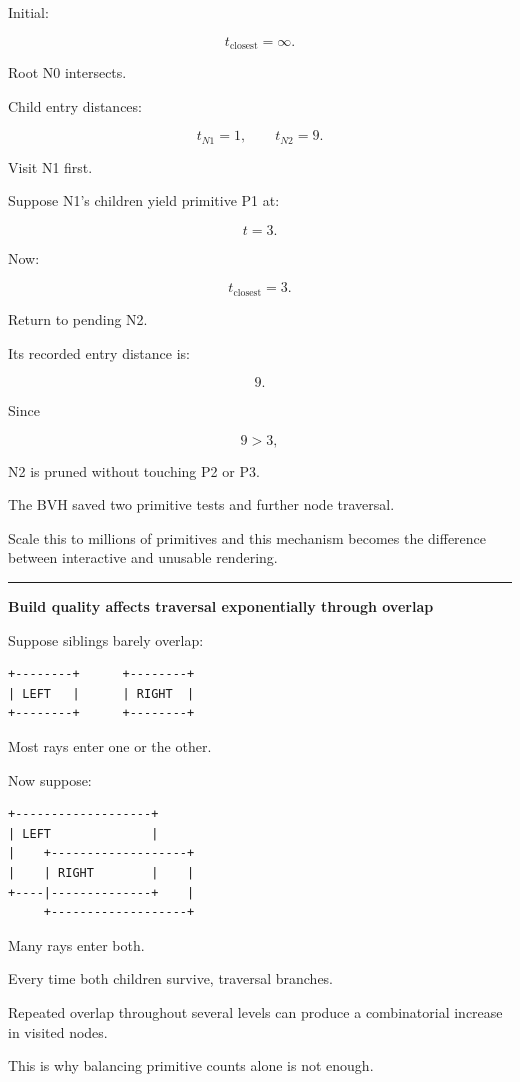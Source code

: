 Initial:

\[
t_{\text{closest}}=\infty.
\]

Root N0 intersects.

Child entry distances:

\[
t_{N1}=1,
\qquad
t_{N2}=9.
\]

Visit N1 first.

Suppose N1's children yield primitive P1 at:

\[
t=3.
\]

Now:

\[
t_{\text{closest}}=3.
\]

Return to pending N2.

Its recorded entry distance is:

\[
9.
\]

Since

\[
9>3,
\]

N2 is pruned without touching P2 or P3.

The BVH saved two primitive tests and further node traversal.

Scale this to millions of primitives and this mechanism becomes the difference between interactive and unusable rendering.

\begin{center}\rule{0.5\linewidth}{0.5pt}\end{center}

\textbf{Build quality affects traversal exponentially through overlap}

Suppose siblings barely overlap:

\begin{verbatim}
+--------+      +--------+
| LEFT   |      | RIGHT  |
+--------+      +--------+
\end{verbatim}

Most rays enter one or the other.

Now suppose:

\begin{verbatim}
+-------------------+
| LEFT              |
|    +-------------------+
|    | RIGHT        |    |
+----|--------------+    |
     +-------------------+
\end{verbatim}

Many rays enter both.

Every time both children survive, traversal branches.

Repeated overlap throughout several levels can produce a combinatorial increase in visited nodes.

This is why balancing primitive counts alone is not enough.

